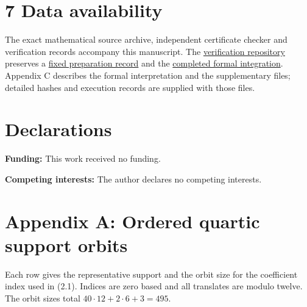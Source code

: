 \documentclass[pdflatex,sn-mathphys-num]{sn-jnl}
\begin{document}
\section*{7 Data availability}

The exact mathematical source archive, independent certificate checker and verification records accompany this manuscript. The \href{https://github.com/contatofilipevono-rgb/hrsbf-bent-verification}{verification repository} preserves a \href{https://github.com/contatofilipevono-rgb/hrsbf-bent-verification/tree/1e0e052/research_updates/2026_10_21_preprint}{fixed preparation record} and the \href{https://github.com/contatofilipevono-rgb/hrsbf-bent-verification/tree/9be0d98/research_updates/2026_10_20_final_integration}{completed formal integration}. Appendix C describes the formal interpretation and the supplementary files; detailed hashes and execution records are supplied with those files.

\section*{Declarations}

\textbf{Funding:} This work received no funding.

\textbf{Competing interests:} The author declares no competing interests.

\section*{Appendix A: Ordered quartic support orbits}

Each row gives the representative support and the orbit size for the coefficient index used in (2.1). Indices are zero based and all translates are modulo twelve. The orbit sizes total $40\cdot12+2\cdot6+3=495$.
\end{document}
